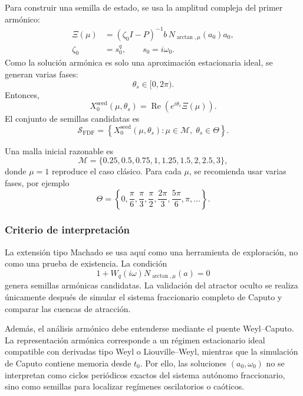 \documentclass[journal]{IEEEtran}
\begin{document}
Para construir una semilla de estado, se usa la amplitud compleja del primer
armónico:
\begin{equation}
\label{eq:Xi_arctan_seed}
\begin{aligned}
\Xi(\mu)
&=
\left(
\zeta_0 I-P
\right)^{-1}
b\,N_{\arctan,\mu}(a_0)a_0,\\
\zeta_0&=s_0^q,
\qquad s_0=i\omega_0.
\end{aligned}
\end{equation}
Como la solución armónica es solo una aproximación estacionaria ideal, se
generan varias fases:
\[
\theta_s\in[0,2\pi).
\]
Entonces,
\begin{equation}
\label{eq:Xseed_arctan_phase}
X_0^{\mathrm{seed}}(\mu,\theta_s)
=
\operatorname{Re}
\left(
e^{i\theta_s}\Xi(\mu)
\right).
\end{equation}
El conjunto de semillas candidatas es
\begin{equation}
\label{eq:seed_family_arctan}
\mathcal S_{\mathrm{FDF}}
=
\left\{
X_0^{\mathrm{seed}}(\mu,\theta_s):
\mu\in\mathcal M,\;
\theta_s\in\Theta
\right\}.
\end{equation}

Una malla inicial razonable es
\[
\mathcal M=
\{0.25,0.5,0.75,1,1.25,1.5,2,2.5,3\},
\]
donde \(\mu=1\) reproduce el caso clásico. Para cada \(\mu\), se recomienda
usar varias fases, por ejemplo
\[
\Theta=
\left\{
0,\frac{\pi}{6},\frac{\pi}{3},\frac{\pi}{2},
\frac{2\pi}{3},\frac{5\pi}{6},\pi,\ldots
\right\}.
\]

\subsubsection{Criterio de interpretación}

La extensión tipo Machado se usa aquí como una herramienta de exploración,
no como una prueba de existencia. La condición
\[
1+
W_q(i\omega)
N_{\arctan,\mu}(a)
=
0
\]
genera semillas armónicas candidatas. La validación del atractor oculto se
realiza únicamente después de simular el sistema fraccionario completo de
Caputo y comparar las cuencas de atracción.

Además, el análisis armónico debe entenderse mediante el puente
Weyl--Caputo. La representación armónica corresponde a un régimen
estacionario ideal compatible con derivadas tipo Weyl o Liouville--Weyl,
mientras que la simulación de Caputo contiene memoria desde \(t_0\). Por ello,
las soluciones \((a_0,\omega_0)\) no se interpretan como ciclos periódicos
exactos del sistema autónomo fraccionario, sino como semillas para localizar
regímenes oscilatorios o caóticos.
\end{document}

